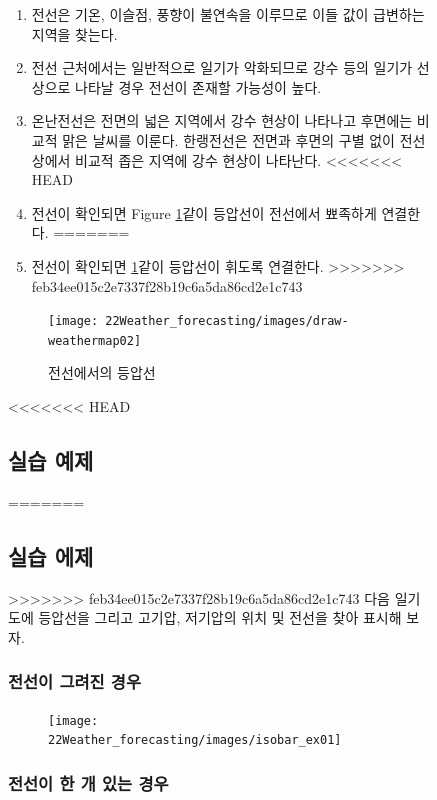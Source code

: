 \begin{figure}[p]
\begin{enumerate}
 \item 전선은 기온, 이슬점, 풍향이 불연속을 이루므로 이들 값이 급변하는 지역을 찾는다.
 \item 전선 근처에서는 일반적으로 일기가 악화되므로 강수 등의 일기가 선상으로 나타날 경우 전선이 존재할 가능성이 높다. 
 \item 온난전선은 전면의 넓은 지역에서 강수 현상이 나타나고 후면에는 비교적 맑은 날씨를 이룬다. 한랭전선은 전면과 후면의 구별 없이 전선 상에서 비교적 좁은 지역에 강수 현상이 나타난다.
<<<<<<< HEAD
 \item 전선이 확인되면 Figure \ref{fig:drawweathermap02}\와 같이 등압선이 전선에서 뾰족하게 연결한다.
=======
 \item 전선이 확인되면 \ref{fig:drawweathermap02}\와 같이 등압선이 휘도록 연결한다.
>>>>>>> feb34ee015c2e7337f28b19c6a5da86cd2e1c743
\end{enumerate}

\begin{figure}[h]
	\centering
	\texttt{[image: 22Weather\_forecasting/images/draw-weathermap02]}
	\caption{전선에서의 등압선}
	\label{fig:drawweathermap02}
\end{figure}

\newpage
<<<<<<< HEAD
\subsection{실습 예제}
=======
\subsection{실습 에제}
>>>>>>> feb34ee015c2e7337f28b19c6a5da86cd2e1c743
다음 일기도에 등압선을 그리고 고기압, 저기압의 위치 및 전선을 찾아 표시해 보자.

\subsubsection{전선이 그려진 경우}

\begin{figure}[h]\center
	\centering
	\texttt{[image: 22Weather\_forecasting/images/isobar\_ex01]}
	\label{fig:isobar_ex01}
\end{figure}

\newpage
\subsubsection{전선이 한 개 있는 경우}


\end{figure}
